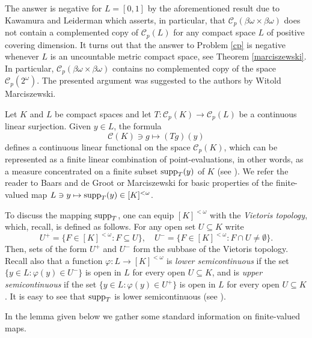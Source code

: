 \documentclass[12pt,fleqn]{amsart}
\numberwithin{equation}{section}
\theoremstyle{definition}
\def\C{\mathcal C}
\newcommand{\bobo}{\beta\omega\times\beta\omega}
\newcommand{\sub}{\subseteq}
\begin{document}
The answer is negative for $L=[0,1]$ by the aforementioned result due to Kawamura and Leiderman \cite{KL17} which asserts, in particular, that $\C_p(\bobo)$ does not contain a complemented copy of $\C_p(L)$ for any compact space $L$ of positive covering dimension.
It turns out that the answer to Problem \ref{cp} is negative whenever $L$ is  an uncountable metric compact space, see Theorem \ref{marciszewski}. In particular, $\C_p(\bobo)$ contains no complemented copy of the space $\C_p(2^\omega)$. The presented argument was suggested to the authors by Witold Marciszewski.

\medskip

\newcommand{\supp}{\protect{\rm supp}}
\newcommand{\vf}{\varphi}

Let $K$ and $L$ be compact spaces and let $T\colon\C_p(K)\to \C_p(L)$ be a continuous linear surjection.  Given  $y\in L$, the formula
\[\C(K)\ni g\mapsto (Tg)(y)\]
defines a continuous linear functional on the space $\C_p(K)$, which can be represented as a finite linear combination of point-evaluations,
in other words, as a measure concentrated on a finite subset $\supp_T(y)$ of $K$ (see \cite[Sections 1.3--1.4]{BG92}). We refer the reader to Baars and de Groot \cite{BG92} or Marciszewski \cite{Ma97} for basic properties of the finite-valued map $L\ni y\mapsto \supp_T(y)\in [K]^{<\omega}$. 

To discuss the mapping $\supp_T$, one can equip $[K]^{<\omega}$ with the \emph{Vietoris topology}, which, recall, is defined as follows. For any open set $U\sub K$ write
\[ U^+=\{F\in [K]^{<\omega}\colon F\sub U\},\quad U^-=\{F\in [K]^{<\omega}\colon F\cap U\neq\emptyset\}.\]
Then, sets of the form $U^+$ and $U^-$ form the subbase of the Vietoris topology. Recall also that a function $\vf\colon L\to[K]^{<\omega}$ is \emph{lower semicontinuous} if the set $\{y\in L\colon \vf(y)\in U^-\}$ is open in $L$ for every open $U\sub K$, and is \emph{upper semicontinuous} if the set $\{y\in L\colon \vf(y)\in U^+\}$ is open in $L$ for every open $U\sub K$. It is easy to see that $\supp_T$ is lower semicontinuous (see \cite[Proposition 1.4.4]{BG92}).

In the lemma given below we gather some standard information on finite-valued maps.
\end{document}
